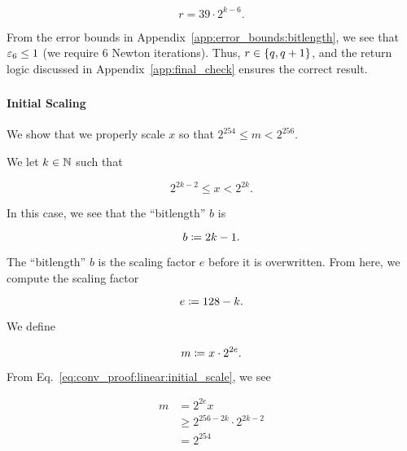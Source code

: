 \begin{equation}
    r = 39\cdot 2^{k-6}.
\end{equation}

From the error bounds in Appendix~\ref{app:error_bounds:bitlength},
we see that $\varepsilon_{6}\le1$ (we require 6 Newton iterations).
Thus, $r\in\left\{ q,q+1 \right\}$, and the return logic
discussed in Appendix~\ref{app:final_check} ensures the correct result.

\subsubsection{\Linear{}}
\label{app:conv_proof:linear}

\paragraph{Initial Scaling}
We show that we properly scale $x$ so that $2^{254}\le m < 2^{256}$.

We let $k\in\mathbb{N}$ such that

\begin{equation}
    2^{2k-2} \le x < 2^{2k}.
    \label{eq:conv_proof:linear:initial_scale}
\end{equation}

\noindent
In this case, we see that the ``bitlength'' $b$ is

\begin{equation}
    b \coloneqq{} 2k-1.
\end{equation}

\noindent
The ``bitlength'' $b$ is the scaling factor $e$ before it is overwritten.
From here, we compute the scaling factor

\begin{equation}
    e \coloneqq{} 128 - k.
\end{equation}

\noindent
We define

\begin{equation}
    m \coloneqq{} x \cdot 2^{2e}.
\end{equation}

\noindent
From Eq.~\eqref{eq:conv_proof:linear:initial_scale},
we see

\begin{align}
    m &= 2^{2e}x \nonumber\\
        &\ge 2^{256 - 2k} \cdot 2^{2k-2} \nonumber\\
        &= 2^{254}
\end{align}

